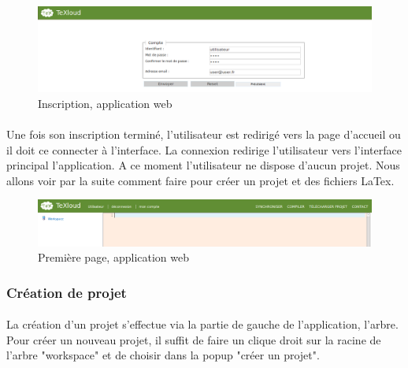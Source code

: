 \documentclass[a4paper,12pt]{article}
\begin{document}
\begin{figure}[!ht]
\begin{center}
  \includegraphics[width=1\textwidth]{./images/screenshot/Inscription.png}
\end{center}
  \caption{Inscription, application web}
  \label{inscriptionWeb}
\end{figure}

\paragraph*{}
Une fois son inscription terminé, l'utilisateur est redirigé vers la page d'accueil ou il doit ce connecter à l'interface. La connexion redirige l'utilisateur vers l'interface principal l'application. A ce moment l'utilisateur ne dispose d'aucun projet. Nous allons voir par la suite comment faire pour créer un projet et des fichiers LaTex.

\begin{figure}[!ht]
\begin{center}
  \includegraphics[width=1\textwidth]{./images/screenshot/PageEdition1.png}
\end{center}
  \caption{Première page, application web}
  \label{firstPageWeb}
\end{figure}

\clearpage
\subsubsection{Création de projet}
\paragraph*{}
La création d'un projet s'effectue via la partie de gauche de l'application, l'arbre. Pour créer un nouveau projet, il suffit de faire un clique droit sur la racine de l'arbre "workspace" et de choisir dans la popup "créer un projet".
\end{document}
